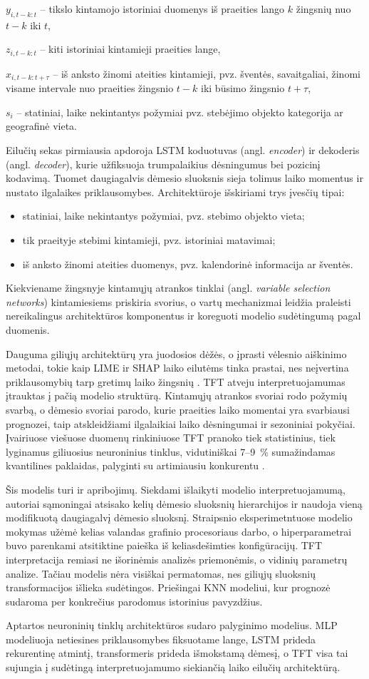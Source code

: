     $y_{i, t-k:t}$ -- tikslo kintamojo istoriniai duomenys iš praeities lango $k$ žingsnių nuo $t-k$ iki $t$,

    $z_{i, t-k:t}$ -- kiti istoriniai kintamieji praeities lange,

    $x_{i, t-k:t+\tau}$ -- iš anksto žinomi ateities kintamieji, pvz. šventės, savaitgaliai, žinomi visame intervale nuo praeities žingsnio $t-k$ iki būsimo žingsnio $t+\tau$,

    $s_i$ -- statiniai, laike nekintantys požymiai pvz. stebėjimo objekto kategorija ar geografinė vieta.

Eilučių sekas pirmiausia apdoroja LSTM koduotuvas (angl. \textit{encoder}) ir dekoderis (angl. \textit{decoder}), kurie užfiksuoja trumpalaikius dėsningumus bei pozicinį kodavimą.
Tuomet daugiagalvis dėmesio sluoksnis sieja tolimus laiko momentus ir nustato ilgalaikes priklausomybes.
Architektūroje išskiriami trys įvesčių tipai:
\begin{itemize}
    \item statiniai, laike nekintantys požymiai, pvz. stebimo objekto vieta;
    \item tik praeityje stebimi kintamieji, pvz. istoriniai matavimai;
    \item iš anksto žinomi ateities duomenys, pvz. kalendorinė informacija ar šventės.
\end{itemize}

Kiekviename žingsnyje kintamųjų atrankos tinklai (angl. \textit{variable selection networks}) kintamiesiems priskiria svorius, o vartų mechanizmai leidžia praleisti nereikalingus architektūros komponentus ir koreguoti modelio sudėtingumą pagal duomenis.

Dauguma giliųjų architektūrų yra juodosios dėžės, o įprasti vėlesnio aiškinimo metodai, tokie kaip LIME ir SHAP laiko eilutėms tinka prastai, nes neįvertina priklausomybių tarp gretimų laiko žingsnių \cite{lim2021}.
TFT atveju interpretuojamumas įtrauktas į pačią modelio struktūrą.
Kintamųjų atrankos svoriai rodo požymių svarbą, o dėmesio svoriai parodo, kurie praeities laiko momentai yra svarbiausi prognozei, taip atskleidžiami ilgalaikiai laiko dėsningumai ir sezoniniai pokyčiai.
Įvairiuose viešuose duomenų rinkiniuose TFT pranoko tiek statistinius, tiek lyginamus giliuosius neuroninius tinklus, vidutiniškai 7--9~\% sumažindamas kvantilines paklaidas, palyginti su artimiausiu konkurentu \cite{lim2021}.

Šis modelis turi ir apribojimų.
Siekdami išlaikyti modelio interpretuojamumą, autoriai sąmoningai atsisako kelių dėmesio sluoksnių hierarchijos ir naudoja vieną modifikuotą daugiagalvį dėmesio sluoksnį.
Straipsnio eksperimetntuose modelio mokymas užėmė kelias valandas grafinio procesoriaus darbo, o hiperparametrai buvo parenkami atsitiktine paieška iš keliasdešimties konfigūracijų.
TFT interpretacija remiasi ne išorinėmis analizės priemonėmis, o vidinių parametrų analize.
Tačiau modelis nėra visiškai permatomas, nes giliųjų sluoksnių transformacijos išlieka sudėtingos.
Priešingai KNN modeliui, kur prognozė sudaroma per konkrečius parodomus istorinius pavyzdžius.

Aptartos neuroninių tinklų architektūros sudaro palyginimo modelius.
MLP modeliuoja netiesines priklausomybes fiksuotame lange, LSTM prideda rekurentinę atmintį, transformeris prideda išmokstamą dėmesį, o TFT visa tai sujungia į sudėtingą interpretuojamumo siekiančią laiko eilučių architektūrą.
